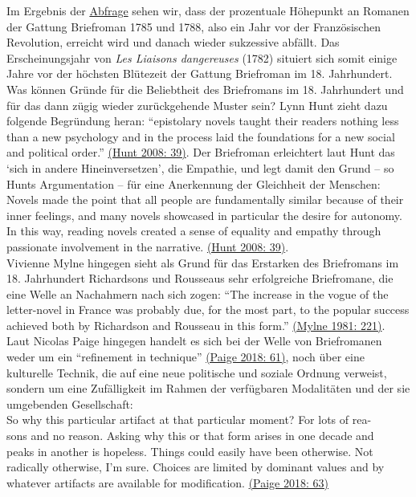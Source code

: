 \documentclass[
  12pt,
  letterpaper,
  DIV=11,
  numbers=noendperiod]{scrreprt}
\begin{document}
Im Ergebnis der \href{https://tinyurl.com/2ddvz9go}{Abfrage} sehen wir,
dass der prozentuale Höhepunkt an Romanen der Gattung Briefroman 1785
und 1788, also ein Jahr vor der Französischen Revolution, erreicht wird
und danach wieder sukzessive abfällt. Das Erscheinungsjahr von \emph{Les
Liaisons dangereuses} (1782) situiert sich somit einige Jahre vor der
höchsten Blütezeit der Gattung Briefroman im 18. Jahrhundert.\\
Was können Gründe für die Beliebtheit des Briefromans im 18. Jahrhundert
und für das dann zügig wieder zurückgehende Muster sein? Lynn Hunt zieht
dazu folgende Begründung heran: ``epistolary novels taught their readers
nothing less than a new psychology and in the process laid the
foundations for a new social and political order.''
\href{https://www.zotero.org/google-docs/?cpFq4P}{(Hunt 2008: 39)}. Der
Briefroman erleichtert laut Hunt das `sich in andere Hineinversetzen',
die Empathie, und legt damit den Grund -- so Hunts Argumentation -- für
eine Anerkennung der Gleichheit der Menschen:\\
Novels made the point that all people are fundamentally similar because
of their inner feelings, and many novels showcased in particular the
desire for autonomy. In this way, reading novels created a sense of
equality and empathy through passionate involvement in the narrative.
\href{https://www.zotero.org/google-docs/?0n93Xf}{(Hunt 2008: 39)}.\\
Vivienne Mylne hingegen sieht als Grund für das Erstarken des
Briefromans im 18. Jahrhundert Richardsons und Rousseaus sehr
erfolgreiche Briefromane, die eine Welle an Nachahmern nach sich zogen:
``The increase in the vogue of the letter-novel in France was probably
due, for the most part, to the popular success achieved both by
Richardson and Rousseau in this form.''
\href{https://www.zotero.org/google-docs/?mIC7gi}{(Mylne 1981: 221)}.
Laut Nicolas Paige hingegen handelt es sich bei der Welle von
Briefromanen weder um ein ``refinement in technique''
\href{https://www.zotero.org/google-docs/?kAnYdL}{(Paige 2018: 61)},
noch über eine kulturelle Technik, die auf eine neue politische und
soziale Ordnung verweist, sondern um eine Zufälligkeit im Rahmen der
verfügbaren Modalitäten und der sie umgebenden Gesellschaft:\\
So why this particular artifact at that particular moment? For lots of
rea-\\
sons and no reason. Asking why this or that form arises in one decade
and\\
peaks in another is hopeless. Things could easily have been otherwise.
Not\\
radically otherwise, I'm sure. Choices are limited by dominant values
and by\\
whatever artifacts are available for modification.
\href{https://www.zotero.org/google-docs/?FyrdSc}{(Paige 2018: 63)}
\end{document}

